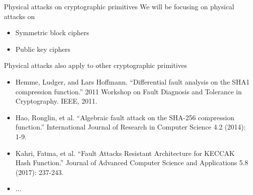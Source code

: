 \begin{frame}{Physical attacks on cryptographic primitives}
We will be focusing on physical attacks on
    \begin{itemize}
        \item Symmetric block ciphers 
        \item Public key ciphers
    \end{itemize}
Physical attacks also apply to other cryptographic primitives
\begin{itemize}
    \item Hemme, Ludger, and Lars Hoffmann. ``Differential fault analysis on the SHA1 compression function.'' 2011 Workshop on Fault Diagnosis and Tolerance in Cryptography. IEEE, 2011.
    \item Hao, Ronglin, et al. ``Algebraic fault attack on the SHA-256 compression function.'' International Journal of Research in Computer Science 4.2 (2014): 1-9.
    \item Kahri, Fatma, et al. ``Fault Attacks Resistant Architecture for KECCAK Hash Function.'' Journal of Advanced Computer Science and Applications 5.8 (2017): 237-243.
    \item $\dots$
\end{itemize}
\end{frame}

